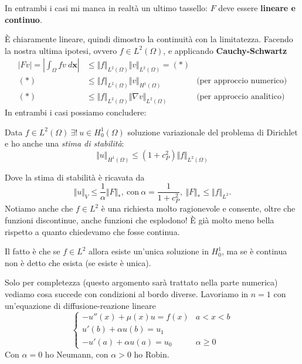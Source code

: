 \documentclass[10pt,a4paper,twoside,openright]{book}
\newcommand{\x}{\mathbf{x}}
\begin{document}
In entrambi i casi mi manca in realtà un ultimo tassello: $\displaystyle F$ deve essere \textbf{lineare e continuo}.

È chiaramente lineare, quindi dimostro la continuità con la limitatezza. Facendo la nostra ultima ipotesi, ovvero $\displaystyle f\in L^{2}( \Omega )$, e applicando \textbf{Cauchy-Schwartz}
\begin{align*}
	| Fv| =\left| \int _{\Omega } fv\ d\x\right| & \leqslant \Vert f\Vert _{L^{2}( \Omega )}\Vert v\Vert _{L^{2}( \Omega )} =( *)  &                                  \\
	( *)                                                 & \leqslant \Vert f\Vert _{L^{2}( \Omega )}\Vert v\Vert _{H^{1}( \Omega )}        & \text{(per approccio numerico)}  \\
	( *)                                                 & \leqslant \Vert f\Vert _{L^{2}( \Omega )}\Vert \nabla v\Vert _{L^{2}( \Omega )} & \text{(per approccio analitico)} 
\end{align*}
In entrambi i casi possiamo concludere:
\begin{theorem}
	Data $\displaystyle f\in L^{2}( \Omega ) \ \exists !\ u\in H_{0}^{1}( \Omega )$ soluzione variazionale del problema di Dirichlet e ho anche una \textit{stima di stabilità}:
	\begin{equation*}
		\Vert u\Vert _{H^{1}( \Omega )} \leqslant \left( 1+c_{P}^{2}\right)\Vert f\Vert _{L^{2}( \Omega )}
	\end{equation*}
\end{theorem}
Dove la stima di stabilità è ricavata da
\begin{equation*}
	\Vert u\Vert _{V} \leqslant \frac{1}{\alpha }\Vert F\Vert _{*} ,\ \text{con} \ \alpha =\frac{1}{1+c_{P}^{2}} ,\ \Vert F\Vert _{*} \leqslant \Vert f\Vert _{L^{2}} .
\end{equation*}
Notiamo anche che $\displaystyle f\in L^{2}$ è una richiesta molto ragionevole e consente, oltre che funzioni discontinue, anche funzioni che esplodono! È già molto meno bella rispetto a quanto chiedevamo che fosse continua.

Il fatto è che se $\displaystyle f\in L^{2}$ allora esiste un'unica soluzione in $\displaystyle H_{0}^{1}$, ma se è continua non è detto che esista (se esiste è unica).



Solo per completezza (questo argomento sarà trattato nella parte numerica) vediamo cosa succede con condizioni al bordo diverse. Lavoriamo in $\displaystyle n=1$ con un'equazione di diffusione-reazione lineare
\begin{equation*}
	\begin{cases}
		-u''( x) +\mu ( x) u=f( x)   & a< x< b            \\
		u'( b) +\alpha u( b) =u_{1}  &                    \\
		-u'( a) +\alpha u( a) =u_{0} & \alpha \geqslant 0 
	\end{cases}
\end{equation*}
Con $\displaystyle \alpha =0$ ho Neumann, con $\displaystyle \alpha  >0$ ho Robin.
\end{document}

